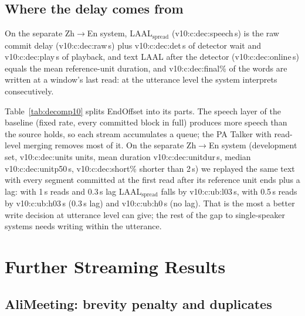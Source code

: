 

\subsection{Where the delay comes from}
\label{app:decomp}

On the separate Zh$\rightarrow$En system, LAAL$_\text{spread}$ (\num{v10:c:dec:speech}\,s) is the raw commit delay
(\num{v10:c:dec:raw}\,s) plus \num{v10:c:dec:det}\,s of detector wait and \num{v10:c:dec:play}\,s of playback, and text
LAAL after the detector (\num{v10:c:dec:online}\,s) equals the mean reference-unit duration, and
\num{v10:c:dec:final}\% of the words are written at a window's last read: at the utterance level the system interprets
consecutively.

Table~\ref{tab:decomp10} splits EndOffset into its parts. The speech layer of the baseline (fixed rate, every committed
block in full) produces more speech than the source holds, so each stream accumulates a queue; the PA Talker with read-level
merging removes most of it. On the separate Zh$\rightarrow$En system (development set,
\num{v10:c:dec:units} units, mean duration \num{v10:c:dec:unitdur}\,s, median \num{v10:c:dec:unitp50}\,s,
\num{v10:c:dec:short}\% shorter than 2\,s) we replayed the same text with every segment committed at the
first read after its reference unit ends plus a lag: with 1\,s reads and 0.3\,s lag LAAL$_\text{spread}$ falls by
\num{v10:c:ub:l03}\,s, with 0.5\,s reads by \num{v10:c:ub:h03}\,s (0.3\,s lag) and \num{v10:c:ub:h0}\,s (no lag). That is
the most a better write decision at utterance level can give; the rest of the gap to single-speaker systems needs
writing within the utterance.



\section{Further Streaming Results}

\subsection{AliMeeting: brevity penalty and duplicates}
\label{app:dup}

